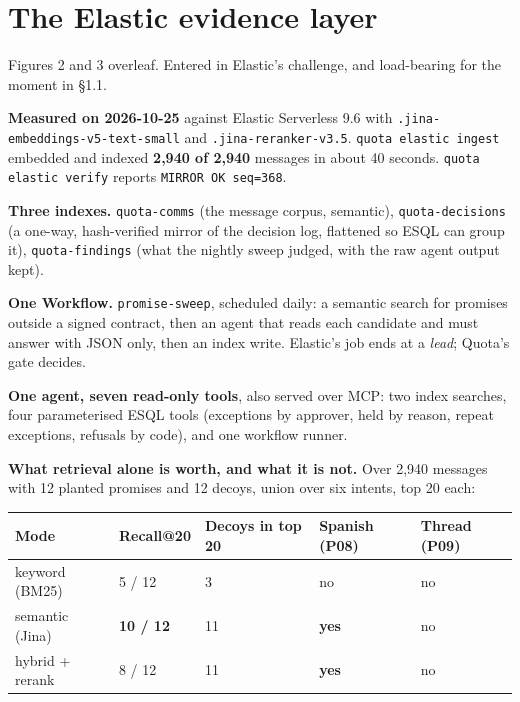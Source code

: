 \documentclass[10pt,a4paper]{article}
\newcommand{\gy}[1]{{\color{qgrey}#1}}
\newcommand{\code}[1]{{\small\texttt{#1}}}
\newcommand{\lead}[1]{{\color{qgrey}\small #1}}
\begin{document}
\section{The Elastic evidence layer}

\lead{Figures 2 and 3 overleaf. Entered in Elastic's challenge, and load-bearing for the moment in \S1.1.}

\begin{elasticbox}
\textbf{Measured on 2026-10-25} against Elastic Serverless 9.6 with \code{.jina-embeddings-v5-text-small} and \code{.jina-reranker-v3.5}. \code{quota elastic ingest} embedded and indexed \textbf{2{,}940 of 2{,}940} messages in about 40 seconds. \code{quota elastic verify} reports \code{MIRROR OK seq=368}.
\end{elasticbox}

\textbf{Three indexes.} \code{quota-comms} \gy{(the message corpus, semantic)}, \code{quota-decisions} \gy{(a one-way, hash-verified mirror of the decision log, flattened so ES\textbar{}QL can group it)}, \code{quota-findings} \gy{(what the nightly sweep judged, with the raw agent output kept)}.

\textbf{One Workflow.} \code{promise-sweep}, scheduled daily: a semantic search for promises outside a signed contract, then an agent that reads each candidate and must answer with JSON only, then an index write. Elastic's job ends at a \emph{lead}; Quota's gate decides.

\textbf{One agent, seven read-only tools}, also served over MCP: two index searches, four parameterised ES\textbar{}QL tools \gy{(exceptions by approver, held by reason, repeat exceptions, refusals by code)}, and one workflow runner.

\textbf{What retrieval alone is worth, and what it is not.} Over 2{,}940 messages with 12 planted promises and 12 decoys, union over six intents, top 20 each:

\begin{tabularx}{\textwidth}{@{}p{34mm}p{24mm}p{30mm}p{24mm}X@{}}
\toprule
\textbf{Mode} & \textbf{Recall@20} & \textbf{Decoys in top 20} & \textbf{Spanish (P08)} & \textbf{Thread (P09)}\\
\midrule
keyword \gy{(BM25)} & 5 / 12 & 3 & no & no\\
semantic \gy{(Jina)} & \textbf{10 / 12} & 11 & \textbf{yes} & no\\
hybrid + rerank & 8 / 12 & 11 & \textbf{yes} & no\\
\bottomrule
\end{tabularx}
\end{document}
